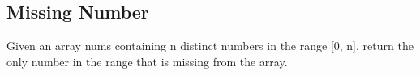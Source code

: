 \subsection{Missing Number}\label{subsec:missing-number}
Given an array nums containing n distinct numbers in the range [0, n], return the only number in the range that is missing from the array.